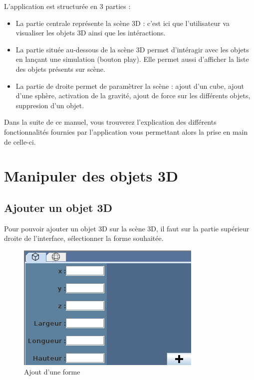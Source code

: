 \documentclass[11pt]{report}
\begin{document}
L'application est structurée en 3 parties :
\begin{itemize}
  \item La partie centrale représente la scène 3D : c'est ici que l'utilisateur va visualiser
  les objets 3D ainsi que les intéractions.
  \item La partie située au-dessous de la scène 3D permet d'intéragir avec les objets en 
  lançant une simulation (bouton play). Elle permet aussi d'afficher la liste des objets présents 
  sur scène.
  \item La partie de droite permet de paramètrer la scène : ajout d'un cube, ajout d'une sphère,
  activation de la gravité, ajout de force sur les différents objets, suppresion d'un objet.\newline 
\end{itemize}


Dans la suite de ce manuel, vous trouverez l'explication des différents fonctionnalités fournies
par l'application vous permettant alors la prise en main de celle-ci.


\chapter{Manipuler des objets 3D}

\section{Ajouter un objet 3D}
Pour pouvoir ajouter un objet 3D sur la scène 3D, il faut sur la partie supérieur droite de l'interface, sélectionner la forme souhaitée.
\newline


\begin{figure}[h]
  \centering
  \includegraphics[scale=0.75]{./ajoutFormes.png}
  \caption{Ajout d'une forme}
\end{figure}
\end{document}
